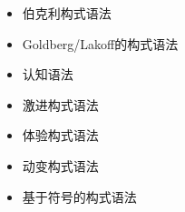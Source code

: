 \begin{sloppypar}
\begin{itemize}
\item 伯克利构式语法 \citep{Fillmore88a,KF99a,FriedHSK}
\item Goldberg/Lakoff的构式语法 \citep{Lakoff87a-u,Goldberg95a,Goldberg2006a}
\item 认知语法 \citep{Langacker87a-u,Langacker2000a,Langacker2008a-u,Dabrowska2004a}
\item 激进构式语法 \citep{Croft2001a}
\item 体验构式语法 \citep{BC2005a}
\item 动变构式语法 \citep{SDB2006a-u,SteelsFluid-ed-not-crossreferenced}
\item 基于符号的构式语法 \citep{Sag2010b,Sag2012a}
\end{itemize}
\end{sloppypar}

